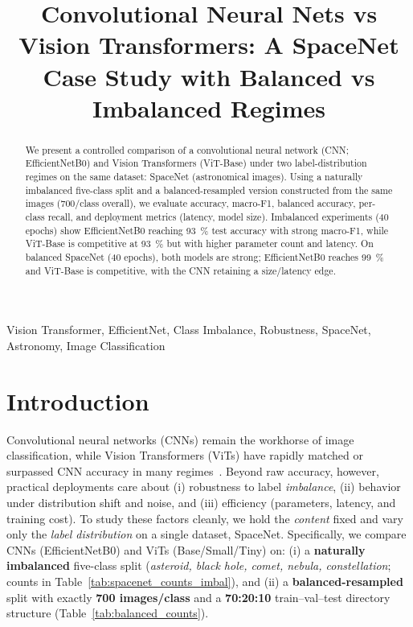 \newcommand{\todo}[1]{\textcolor{red}{[TODO: #1]}}



\title{Convolutional Neural Nets vs Vision Transformers: A SpaceNet Case Study with Balanced vs Imbalanced Regimes}

\author{
}

\maketitle

\begin{abstract}
We present a controlled comparison of a convolutional neural network (CNN; EfficientNetB0) and Vision Transformers (ViT-Base) under two label-distribution regimes on the same dataset: SpaceNet (astronomical images). Using a naturally imbalanced five-class split and a balanced-resampled version constructed from the same images (700/class overall), we evaluate accuracy, macro-F1, balanced accuracy, per-class recall, and deployment metrics (latency, model size). Imbalanced experiments (40 epochs) show EfficientNetB0 reaching \SI{93}{\percent} test accuracy with strong macro-F1, while ViT-Base is competitive at \SI{93}{\percent} but with higher parameter count and latency. On balanced SpaceNet (40 epochs), both models are strong; EfficientNetB0 reaches \SI{99}{\percent} and ViT-Base is competitive, with the CNN retaining a size/latency edge.
\end{abstract}

\begin{IEEEkeywords}
Vision Transformer, EfficientNet, Class Imbalance, Robustness, SpaceNet, Astronomy, Image Classification
\end{IEEEkeywords}

\section{Introduction}
Convolutional neural networks (CNNs) remain the workhorse of image classification, while Vision Transformers (ViTs) have rapidly matched or surpassed CNN accuracy in many regimes~\cite{He2016ResNet,Dosovitskiy2020ViT}. Beyond raw accuracy, however, practical deployments care about (i) robustness to label \emph{imbalance}, (ii) behavior under distribution shift and noise, and (iii) efficiency (parameters, latency, and training cost). To study these factors cleanly, we hold the \emph{content} fixed and vary only the \emph{label distribution} on a single dataset, SpaceNet. Specifically, we compare CNNs (EfficientNetB0) and ViTs (Base/Small/Tiny) on: (i) a \textbf{naturally imbalanced} five-class split (\emph{asteroid, black hole, comet, nebula, constellation}; counts in Table~\ref{tab:spacenet_counts_imbal}), and (ii) a \textbf{balanced-resampled} split with exactly \textbf{700 images/class} and a \textbf{70:20:10} train–val–test directory structure (Table~\ref{tab:balanced_counts}). 

